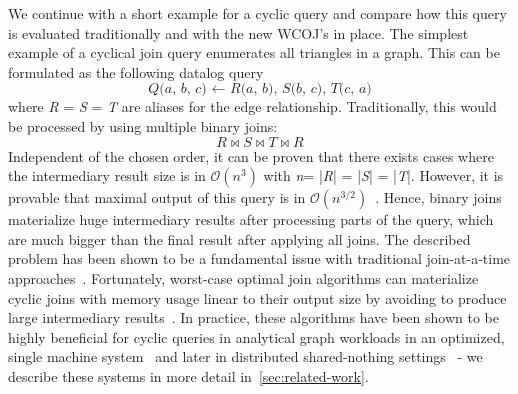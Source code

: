 We continue with a short example for a cyclic query and compare how this query is evaluated traditionally and with the new WCOJ's in place.
The simplest example of a cyclical join query enumerates all triangles in a graph.
This can be formulated as the following datalog query
\begin{equation}
    \textit{Q(a, b, c) $\leftarrow$ R(a, b), S(b, c), T(c, a)}
\end{equation} 
 where \textit{R} = \textit{S} = \textit{T} are aliases for the edge relationship.
Traditionally, this would be processed by using multiple binary joins:
\begin{equation}
    R \bowtie S \bowtie T \bowtie R
\end{equation}
Independent of the chosen order, it can be proven that there exists cases where the intermediary result size is in $\mathcal{O}(n^3)$ with \textit{n}= |\textit{R}| = |\textit{S}| = |\textit{T}|. 
However, it is provable that maximal output of this query is in $\mathcal{O}(n^{3/2})$~\cite{agm,skew-strikes-back}. 
Hence, binary joins materialize huge intermediary results after processing parts of the query, which are much bigger than the final result after applying all joins.
The described problem has been shown to be a fundamental issue with traditional join-at-a-time approaches~\cite{agm,skew-strikes-back}. 
Fortunately, worst-case optimal join algorithms can materialize cyclic joins with memory usage linear to their output size by avoiding to produce large intermediary results~\cite{leapfrog,nprr}.
In practice, these algorithms have been shown to be highly beneficial for cyclic queries in analytical graph workloads in an optimized, single machine system~\cite{leapfrog,olddog} and later in distributed shared-nothing settings~\cite{myria-detailed,ammar2018distributed} - we describe these systems in more detail in~\cref{sec:related-work}.


